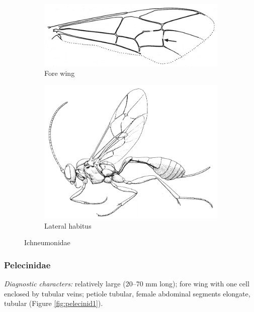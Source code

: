 \documentclass[letterpaper, 11pt]{article}
\begin{document}
\begin{figure}[ht!]
    \centering
    \begin{subfigure}[ht!]{0.5\textwidth}
        \includegraphics[width=\textwidth]{IchneumonidWing}
        \caption{Fore wing \citep[][pg. 359]{goulet1993hymenoptera}}
        \label{fig:ichneumonid1}
    \end{subfigure}
    \hfill
    \begin{subfigure}[ht!]{0.4\textwidth}
        \includegraphics[width=\textwidth]{IchneumonidHabitus}
        \caption{Lateral habitus \citep[][Fig. 159]{goulet1993hymenoptera}}
        \label{fig:ichneumonid2}
    \end{subfigure}
    \caption{Ichneumonidae}\label{fig:ichneumonids}
\end{figure}

\subsubsection{Pelecinidae}
\noindent{}\textit{Diagnostic characters:} relatively large (20--70 mm long); fore wing with one cell enclosed by tubular veins; petiole tubular, female abdominal segments elongate, tubular (Figure \ref{fig:pelecinid1}).\\
\end{document}
